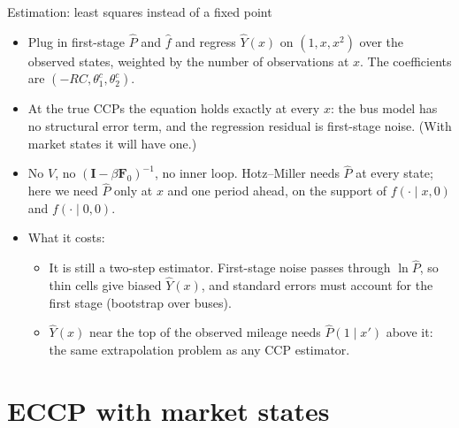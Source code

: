 \documentclass[aspectratio=169,11pt]{beamer}
\begin{document}
\begin{frame}{Estimation: least squares instead of a fixed point}
\small
\begin{itemize}
\item Plug in first-stage $\hat P$ and $\hat f$ and regress $\hat Y(x)$ on $(1, x, x^2)$ over the observed states, weighted by the number of observations at $x$. The coefficients are $(-RC, \theta^c_1, \theta^c_2)$.
\item At the true CCPs the equation holds \alert{exactly} at every $x$: the bus model has no structural error term, and the regression residual is first-stage noise. (With market states it will have one.)
\item No $V$, no $(\symbf I - \beta \symbf F_0)^{-1}$, no inner loop. Hotz--Miller needs $\hat P$ at every state; here we need $\hat P$ only at $x$ and one period ahead, on the support of $f(\cdot \mid x,0)$ and $f(\cdot \mid 0,0)$.
\item What it costs:
\begin{itemize}
\item It is still a two-step estimator. First-stage noise passes through $\ln \hat P$, so thin cells give biased $\hat Y(x)$, and standard errors must account for the first stage (bootstrap over buses).
\item $\hat Y(x)$ near the top of the observed mileage needs $\hat P(1 \mid x')$ above it: the same extrapolation problem as any CCP estimator.
\end{itemize}
\end{itemize}
\end{frame}

\section{ECCP with market states}
\end{document}
